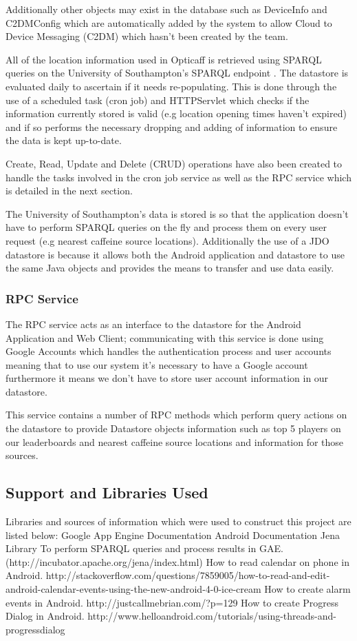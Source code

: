 Additionally other objects may exist in the database such as DeviceInfo and C2DMConfig which are automatically added by the system to allow Cloud to Device Messaging (C2DM) which hasn't been created by the team. 

All of the location information used in Opticaff is retrieved using SPARQL queries on the University of Southampton’s SPARQL endpoint \cite{SotonSparql}. The datastore is evaluated daily to ascertain if it needs re-populating. This is done through the use of a scheduled task (cron job) and HTTPServlet which checks if the information currently stored is valid (e.g location opening times haven't expired) and if so performs the necessary dropping and adding of information to ensure the data is kept up-to-date.

Create, Read, Update and Delete (CRUD) operations have also been created to handle the tasks involved in the cron job service as well as the RPC service which is detailed in the next section.

The University of Southampton's data is stored is so that the application doesn't have to perform SPARQL queries on the fly and process them on every user request (e.g nearest caffeine source locations). Additionally the use of a JDO datastore is because it allows both the Android application and datastore to use the same Java objects and provides the means to transfer and use data easily.

\subsubsection{RPC Service}
The RPC service acts as an interface to the datastore for the Android Application and Web Client; communicating with this service is done using Google Accounts which handles the authentication process and user accounts meaning that to use our system it's necessary to have a Google account furthermore it means we don't have to store user account information in our datastore. 

This service contains a number of RPC methods which perform query actions on the datastore to provide Datastore objects information such as top 5 players on our leaderboards and nearest caffeine source locations and information for those sources.

\subsection{Support and Libraries Used}
Libraries and sources of information which were used to construct this project are listed below:
Google App Engine Documentation
Android Documentation
Jena Library 
To perform SPARQL queries and process results in GAE.
(http://incubator.apache.org/jena/index.html)
How to read calendar on phone in Android.
http://stackoverflow.com/questions/7859005/how-to-read-and-edit-android-calendar-events-using-the-new-android-4-0-ice-cream
How to create alarm events in Android.
http://justcallmebrian.com/?p=129
How to create Progress Dialog in Android.
http://www.helloandroid.com/tutorials/using-threads-and-progressdialog

